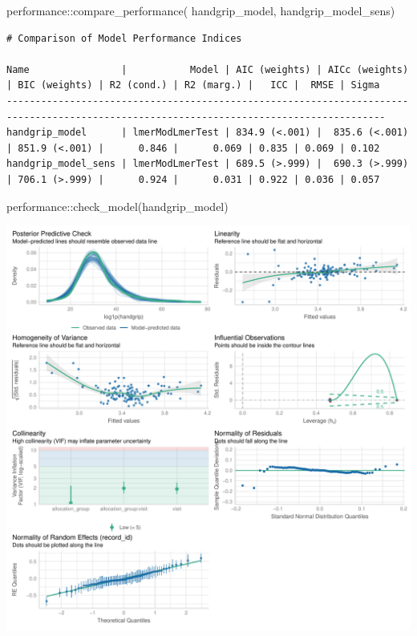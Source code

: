 \documentclass[
  12pt,
]{article}
\newenvironment{Shaded}{\begin{snugshade}}{\end{snugshade}}
\newcommand{\FunctionTok}[1]{\textcolor[rgb]{0.28,0.35,0.67}{#1}}
\newcommand{\NormalTok}[1]{\textcolor[rgb]{0.00,0.23,0.31}{#1}}
\newcommand{\SpecialCharTok}[1]{\textcolor[rgb]{0.37,0.37,0.37}{#1}}
\begin{document}
\begin{Shaded}
\begin{Highlighting}[]
\NormalTok{performance}\SpecialCharTok{::}\FunctionTok{compare\_performance}\NormalTok{(}
\NormalTok{    handgrip\_model, }
\NormalTok{    handgrip\_model\_sens) }
\end{Highlighting}
\end{Shaded}

\begin{verbatim}
# Comparison of Model Performance Indices

Name                |           Model | AIC (weights) | AICc (weights) | BIC (weights) | R2 (cond.) | R2 (marg.) |   ICC |  RMSE | Sigma
----------------------------------------------------------------------------------------------------------------------------------------
handgrip_model      | lmerModLmerTest | 834.9 (<.001) |  835.6 (<.001) | 851.9 (<.001) |      0.846 |      0.069 | 0.835 | 0.069 | 0.102
handgrip_model_sens | lmerModLmerTest | 689.5 (>.999) |  690.3 (>.999) | 706.1 (>.999) |      0.924 |      0.031 | 0.922 | 0.036 | 0.057
\end{verbatim}

\begin{Shaded}
\begin{Highlighting}[]
\NormalTok{performance}\SpecialCharTok{::}\FunctionTok{check\_model}\NormalTok{(handgrip\_model)}
\end{Highlighting}
\end{Shaded}

\includegraphics{Outcomes_files/figure-pdf/handgrip_4-1.pdf}
\end{document}
